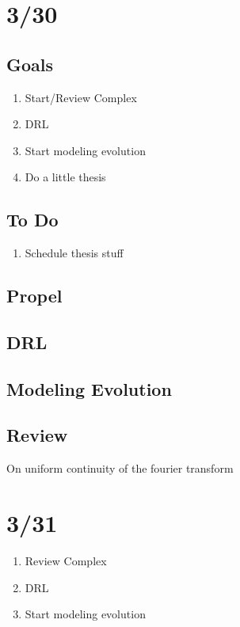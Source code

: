 \documentclass[11pt]{article}
\theoremstyle{remark}
\begin{document}
\section{3/30}

\subsection{Goals}

\begin{enumerate}
	\item Start/Review Complex
	\item DRL
	\item Start modeling evolution
	\item Do a little thesis
\end{enumerate}

\subsection{To Do}

\begin{enumerate}
	\item Schedule thesis stuff
\end{enumerate}

\subsection{Propel}

\subsection{DRL}

\subsection{Modeling Evolution}

\subsection{Review}

On uniform continuity of the fourier transform

\section{3/31}


\begin{enumerate}
	\item Review Complex
	\item DRL
	\item Start modeling evolution
\end{enumerate}
\end{document}
